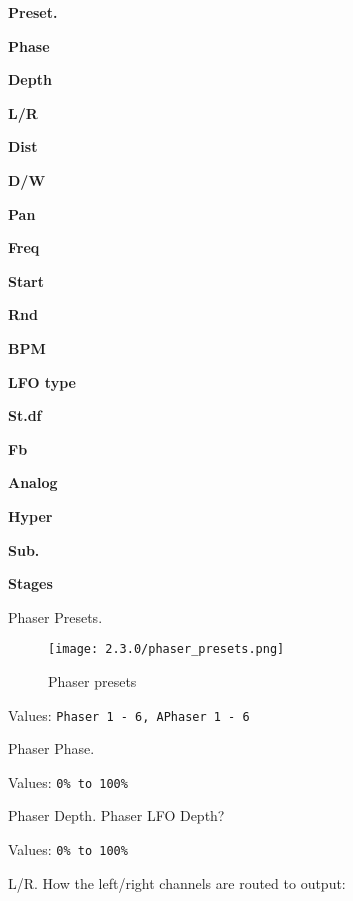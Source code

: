 
   \begin{enumber}
      \item \textbf{Preset.}
      \item \textbf{Phase}
      \item \textbf{Depth}
      \item \textbf{L/R}
      \item \textbf{Dist}
      \item \textbf{D/W}
      \item \textbf{Pan}
      \item \textbf{Freq}
      \item \textbf{Start}
      \item \textbf{Rnd}
      \item \textbf{BPM}
      \item \textbf{LFO type}
      \item \textbf{St.df}
      \item \textbf{Fb}
      \item \textbf{Analog}
      \item \textbf{Hyper}
      \item \textbf{Sub.}
      \item \textbf{Stages}

   \end{enumber}


\setcounter{ItemCounter}{0}

   Phaser Presets.

\begin{figure}[H]
   \centering
   \texttt{[image: 2.3.0/phaser\_presets.png]}
   \caption{Phaser presets}
   \label{fig:phaser-presets}
\end{figure}
   Values: \texttt{Phaser 1 - 6, APhaser 1 - 6}

   Phaser Phase.

   Values: \texttt{0\% to 100\%}

   Phaser Depth. Phaser LFO Depth?

   Values: \texttt{0\% to 100\%}

   L/R. How the left/right channels are routed to output:

